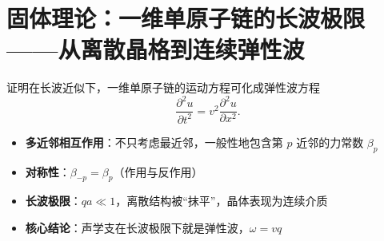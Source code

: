 \section{固体理论：一维单原子链的长波极限——从离散晶格到连续弹性波}
\label{sec:long-wave-continuum}

\begin{modelbox}[题目：证明长波近似下离散晶格退化为弹性波方程]
证明在长波近似下，一维单原子链的运动方程可化成弹性波方程
\begin{equation}
\frac{\partial^2 u}{\partial t^2} = v^2\frac{\partial^2 u}{\partial x^2}.
\end{equation}
\end{modelbox}

\begin{tipbox}[考点快速分析]
\begin{itemize}
    \item \textbf{多近邻相互作用}：不只考虑最近邻，一般性地包含第 $p$ 近邻的力常数 $\beta_p$
    \item \textbf{对称性}：$\beta_{-p}=\beta_p$（作用与反作用）
    \item \textbf{长波极限}：$qa\ll1$，离散结构被``抹平''，晶体表现为连续介质
    \item \textbf{核心结论}：声学支在长波极限下就是弹性波，$\omega=vq$
\end{itemize}
\end{tipbox}

